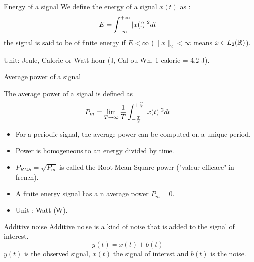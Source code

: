  \begin{block}{Energy of a signal}
  We define the energy of a signal $x(t)$ as :
\begin{equation}
\label{eq:enerfinie}
E= \int_{-\infty}^{+\infty}|x(t)|^2dt
\end{equation}
the signal is said to be of finite energy if $E<\infty$ ($\|x\|_2<\infty$ means $x\in L_2(\mathbb{R})$).

Unit: Joule, Calorie or Watt-hour (J, Cal ou Wh, 1 calorie = 4.2 J).
\end{block}

\begin{block}{Average power of a signal}
  
  The average power of a signal is defined as
   \begin{equation}
     \label{eq:puissance}
    P_m= \lim_{T\rightarrow\infty} \frac{1}{T}\int_{-\frac{T}{2}}^{+\frac{T}{2}}|x(t)|^2dt
   \end{equation}
   \begin{itemize}
   \item For a periodic signal, the average power can be computed on a unique period.
   \item Power is homogeneous to an energy divided by time.
   \item $P_{RMS}=\sqrt{P_m}$ is called the Root Mean Square power ("valeur efficace" in french).
   \item A finite energy signal has a n average power $P_m=0$.
   \item  Unit :  Watt (W).
   \end{itemize}
   
     \end{block}


     \begin{block}{Additive noise}
      Additive noise is a kind of noise that is added to the signal of interest.
  $$y(t)=x(t)+b(t)$$
  $y(t)$ is the observed signal, $x(t)$ the signal of interest and
  $b(t)$ is the noise.
    \end{block}

